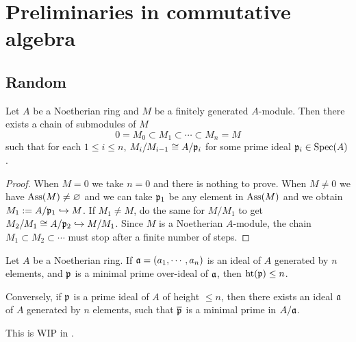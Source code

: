 \section{Preliminaries in commutative algebra}

\subsection{Random}

\begin{prop}
\label{noeth-ring-filtration}
\leanok
Let $A$ be a Noetherian ring and $M$ be a finitely generated $A$-module.
Then there exists a chain of submodules of $M$
\[0 = M_0 \subset M_1 \subset \cdots \subset M_n = M\]
such that for each $1\leq i\leq n$, $M_i/M_{i-1} \cong A/{\mathfrak{p}}_i$ for some prime ideal ${\mathfrak{p}}_i\in{\mathrm{Spec}}(A)$.
\end{prop}

\begin{proof}
\leanok
When $M=0$ we take $n=0$ and there is nothing to prove.
When $M\neq 0$ we have $\operatorname{Ass}(M)\neq\varnothing$
and we can take ${\mathfrak{p}}_1$ be any element in $\operatorname{Ass}(M)$
and we obtain $M_1:=A/{\mathfrak{p}}_1\hookrightarrow M$.
If $M_1\neq M$, do the same for $M/M_1$ to get $M_2/M_1\cong A/{\mathfrak{p}}_2\hookrightarrow M/M_1$.
Since $M$ is a Noetherian $A$-module,
the chain $M_1\subset M_2\subset\cdots$ must stop after a finite number of steps.
\end{proof}

\begin{thm}
\label{krull-principal-ideal-thm}
Let $A$ be a Noetherian ring.
If ${\mathfrak{a}}=(a_1,\cdots,a_n)$ is an ideal of $A$ generated by $n$ elements,
and ${\mathfrak{p}}$ is a minimal prime over-ideal of ${\mathfrak{a}}$, then ${\mathrm{ht}}({\mathfrak{p}})\leq n$.

Conversely, if ${\mathfrak{p}}$ is a prime ideal of $A$ of height $\leq n$,
then there exists an ideal ${\mathfrak{a}}$ of $A$ generated by $n$ elements, such that
$\overline{{\mathfrak{p}}}$ is a minimal prime in $A/{\mathfrak{a}}$.
\end{thm}

This is WIP in .

